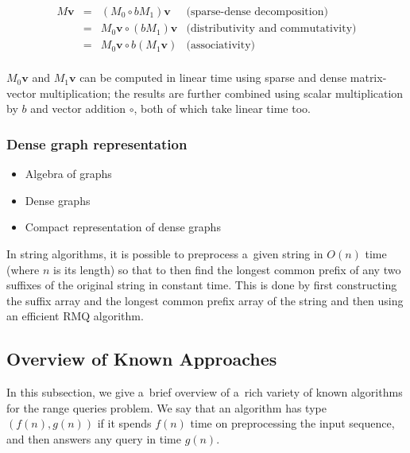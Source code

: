 \documentclass[11pt,letterpaper]{article}
\begin{document}
\[
\begin{array}{rcll}
M \mathbf{v} & = & (M_0 \circ b M_1) \mathbf{v} & \text{(sparse-dense decomposition)}\\
 & = & M_0 \mathbf{v} \circ (b M_1) \mathbf{v} & \text{(distributivity and commutativity)}\\
 & = & M_0 \mathbf{v} \circ b (M_1 \mathbf{v}) & \text{(associativity)}\\
\end{array}
\]

\noindent
$M_0 \mathbf{v}$ and $M_1 \mathbf{v}$ can be computed in linear time using
sparse and dense matrix-vector multiplication; the results are further combined
using scalar multiplication by $b$ and vector addition $\circ$, both of which
take linear time too.



\subsubsection{Dense graph representation}\label{sec-dense-graph}



\begin{itemize}
  \item Algebra of graphs
  \item Dense graphs
  \item Compact representation of dense graphs
\end{itemize}


In string algorithms, it is possible to preprocess a~given string in $O(n)$ time (where $n$ is its length) so that to then find the longest common prefix of any two suffixes of the original string in constant time. This is done by first constructing the suffix array and the longest common prefix array of the string and then using  an efficient RMQ algorithm.


\subsection{Overview of Known Approaches}
In this subsection, we give a~brief overview of a~rich variety of known algorithms for the range queries problem. We say that an algorithm has type $(f(n), g(n))$ if it spends $f(n)$ time on preprocessing the input sequence, and then answers any query in time $g(n)$.
\end{document}

